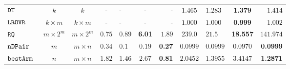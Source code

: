 {\begin {table}[t]
\begin{center}
{\begin{tabular}{|| >{\tiny}l || c | c || c | l | c | r || c | l | c | r || }
       $\mathtt{DT}$ & $k$ &  $k$ & -  & - & - & - & $ 1.465$  & $ 1.283$ & \textbf{1.379 } & {$1.414$}   \\
        \hhline{||-||---||-||--||----||}
       $\mathtt{LROVR}$  & $k \times m$ &  $ k \times m $  & -  & - & - & -  &  $ 1.000  $  &  $ 1.000 $ & {\textbf{ 0.999}} & $ 1.002 $  \\
       \hhline{||-||---||-||--||----||}
       $\mathtt{RQ}$~\cite{Jamieson2015TheAO} & $ m \times 2^m $ & $  m \times 2^m $  & $0.75$  & $0.89$ & \textbf{6.01} & $1.89$ & $239.0$   & $21.5$ & {\textbf{18.557}} & $141.974$   \\
       \hhline{||-||---||-||--||----||}
       $\mathtt{nDPair}$~\cite{Jamieson2015TheAO} & $ m $ & $  m \times n  $   & $0.34$  & $0.1$ & $0.19$ & \textbf{0.27} & $0.0999$   & $0.0999$ & $0.0970$ & \textbf{0.0999}   \\
       \hhline{||-||---||-||--||----||}
       $\mathtt{bestArm}$~\cite{Jamieson2015TheAO} & $ n $ & $  m \times n $  & $1.82$  & $1.46$ & $2.67$ & \textbf{0.81}& $ 2.0452$   & $ 1.3955$ & {{$3.4147$}} & \textbf{1.2871} \\

\end{tabular}}
\end{center}
\end{table}}
